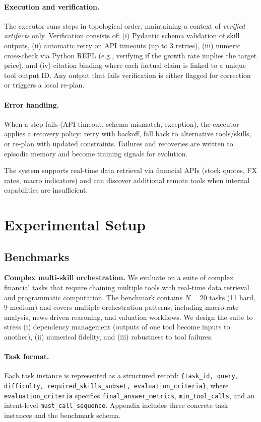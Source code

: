\documentclass{article}
\begin{document}
\paragraph{Execution and verification.}
The executor runs steps in topological order, maintaining a context of \emph{verified artifacts} only. Verification consists of:
(i) Pydantic schema validation of skill outputs,
(ii) automatic retry on API timeouts (up to 3 retries),
(iii) numeric cross-check via Python REPL (e.g., verifying if the growth rate implies the target price),
and (iv) citation binding where each factual claim is linked to a unique tool output ID.
Any output that fails verification is either flagged for correction or triggers a local re-plan.

\paragraph{Error handling.}
When a step fails (API timeout, schema mismatch, exception), the executor applies a recovery policy: retry with backoff, fall back to alternative tools/skills, or re-plan with updated constraints. Failures and recoveries are written to episodic memory and become training signals for evolution.

The system supports real-time data retrieval via financial APIs (stock quotes, FX rates, macro indicators) and can discover additional remote tools when internal capabilities are insufficient.

\section{Experimental Setup}
\subsection{Benchmarks}
\textbf{Complex multi-skill orchestration.}
We evaluate on a suite of complex financial tasks that require chaining multiple tools with real-time data retrieval and programmatic computation. The benchmark contains $N=20$ tasks (11 hard, 9 medium) and covers multiple orchestration patterns, including macro-rate analysis, news-driven reasoning, and valuation workflows. We design the suite to stress (i) dependency management (outputs of one tool become inputs to another), (ii) numerical fidelity, and (iii) robustness to tool failures.

\paragraph{Task format.}
Each task instance is represented as a structured record:
\texttt{\{task\_id, query, difficulty, required\_skills\_subset, evaluation\_criteria\}},
where \texttt{evaluation\_criteria} specifies \texttt{final\_answer\_metrics}, \texttt{min\_tool\_calls}, and an intent-level \texttt{must\_call\_sequence}. Appendix includes three concrete task instances and the benchmark schema.
\end{document}
